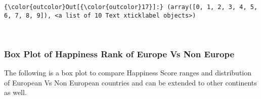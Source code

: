 \documentclass[11pt]{article}
\begin{document}
\begin{Verbatim}[commandchars=\\\{\}]
{\color{outcolor}Out[{\color{outcolor}17}]:} (array([0, 1, 2, 3, 4, 5, 6, 7, 8, 9]), <a list of 10 Text xticklabel objects>)
\end{Verbatim}
            
    \begin{center}
    \end{center}
    { \hspace*{\fill} \\}
    
    \subsubsection{Box Plot of Happiness Rank of Europe Vs Non
Europe}\label{box-plot-of-happiness-rank-of-europe-vs-non-europe}

The following is a box plot to compare Happiness Score ranges and
distribution of European Vs Non European countries and can be extended
to other continents as well.
\end{document}
